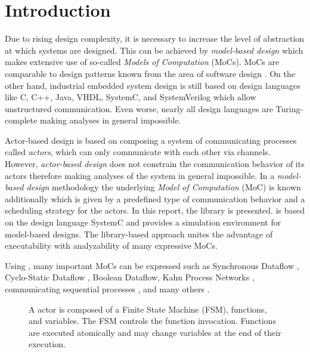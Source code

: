 \chapter{Introduction}

Due to rising design complexity, it is necessary to increase the level of abstraction at which systems are designed.
This can be achieved by \emph{model-based design} which makes extensive use of so-called \emph{Models of Computation} \cite{embsft:2002} (MoCs).
MoCs are comparable to design patterns known from the area of software design \cite{gamma:1995}.
On the other hand, industrial embedded system design is still based on design languages like C, C++, Java, VHDL, SystemC, and SystemVerilog which allow unstructured communication.
Even worse, nearly all design languages are Turing-complete making analyses in general impossible.

Actor-based design is based on composing a system of communicating processes called \emph{actors}, which can only communicate with each other via channels.
However, \emph{actor-based design} does not constrain the communication behavior of its actors therefore making analyses of the system in general impossible.
In a \emph{model-based design} methodology the underlying \emph{Model of Computation} (MoC) is known additionally which is given by a predefined type of communication behavior and a scheduling strategy for the actors.
In this report, the \SysteMoC{} library \cite{fht:2006} is presented.
\SysteMoC{} is based on the design language SystemC and provides a simulation environment for model-based designs.
The library-based approach unites the advantage of executability with analyzability of many expressive MoCs.

Using \SysteMoC, many important MoCs can be expressed such as Synchronous Dataflow \cite{Lee87b:1987}, Cyclo-Static Dataflow \cite{belp:1996, eblp:1994}, Boolean Dataflow, Kahn Process Networks \cite{Kahn:1974}, communicating sequential processes \cite{csphoare:1985}, and many others \cite{tszet:1999, LeeDenotialDF:1997, embsft:2002, Lee98, Eker, gb:2004}.

\begin{figure}
\centering

\caption{A \SysteMoC{} actor is composed of a Finite State Machine (FSM), functions, and variables. The FSM controls the function invocation. Functions are executed atomically and may change variables at the end of their execution.}
\label{fig:actor-scheme}
\end{figure}

